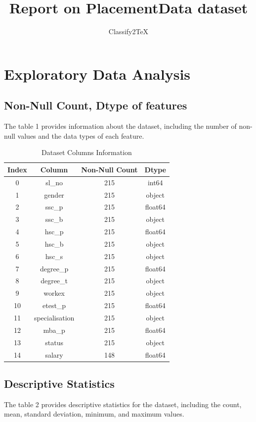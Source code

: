 \documentclass{article}%
\title{Report on PlacementData dataset}%
\author{Classify2TeX}%
\begin{document}
%
\normalsize%
\maketitle%
\newpage%
\tableofcontents%
\newpage%
\section{Exploratory Data Analysis}%
\label{sec:ExploratoryDataAnalysis}%
\subsection{Non{-}Null Count, Dtype of features}%
\label{subsec:Non{-}NullCount,Dtypeoffeatures}%
The table 1 provides information about the dataset, including the number of non-null values and the data types of each feature.%


\begin{table}[h!]%
\caption{Dataset Columns Information}%
\vspace{0.2cm}%
\centering%
\begin{tabular}{|c||c||c||c|}%
\hline%
Index&Column&Non{-}Null Count&Dtype\\%
\hline%
0&sl\_no&215&int64\\%
1&gender&215&object\\%
2&ssc\_p&215&float64\\%
3&ssc\_b&215&object\\%
4&hsc\_p&215&float64\\%
5&hsc\_b&215&object\\%
6&hsc\_s&215&object\\%
7&degree\_p&215&float64\\%
8&degree\_t&215&object\\%
9&workex&215&object\\%
10&etest\_p&215&float64\\%
11&specialisation&215&object\\%
12&mba\_p&215&float64\\%
13&status&215&object\\%
14&salary&148&float64\\%
\hline%
\end{tabular}%
\end{table}

%
\newpage%
\subsection{Descriptive Statistics}%
\label{subsec:DescriptiveStatistics}%
The table 2 provides descriptive statistics for the dataset, including the count, mean, standard deviation, minimum, and maximum values.%
\end{document}
